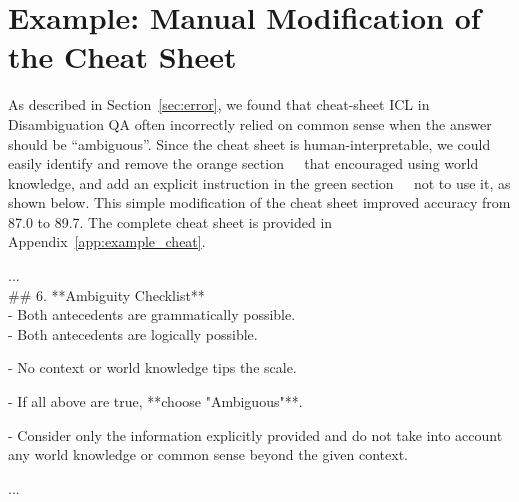 \documentclass[11pt]{article}
\begin{document}
\section{Example: Manual Modification of the Cheat Sheet}
\label{app:manual_revision}

As described in Section~\ref{sec:error}, we found that cheat-sheet ICL in Disambiguation QA often incorrectly relied on common sense when the answer should be ``ambiguous''.
Since the cheat sheet is human-interpretable, we could easily identify and remove the \colorbox{diffred!40}{orange section \textcolor{white}{$-$}} that encouraged using world knowledge, and add an explicit instruction in the \colorbox{diffgreen!40}{green section \textcolor{white}{$+$}}  not to use it, as shown below.
This simple modification of the cheat sheet improved accuracy from 87.0 to 89.7.
The complete cheat sheet is provided in Appendix~\ref{app:example_cheat}.

\begin{tcolorbox}[title=Manual Modification of Cheat Sheet, colback=white, colframe=black!70, boxrule=0.5pt, top=0pt, bottom=0pt, left=0pt, right=0pt, arc=0.8mm]
...\\
\#\# 6. **Ambiguity Checklist**\\
- Both antecedents are grammatically possible.\\
- Both antecedents are logically possible.
\begin{tcolorbox}[
    colback=diffred!40,
    colframe=white,
    boxrule=0pt,
    leftrule=0pt, rightrule=0pt, toprule=0pt, bottomrule=0pt,
    sharp corners,
    boxsep=0pt, left=0pt, right=0pt, top=0pt, bottom=0pt,
    width=\textwidth,
    enlarge left by=0mm, enlarge right by=0mm,
    before skip=3pt, after skip=3pt,
]
- No context or world knowledge tips the scale.~\textcolor{white}{$\bm{-}$}
\end{tcolorbox}
- If all above are true, **choose "Ambiguous"**.
\begin{tcolorbox}[
    colback=diffgreen!40,
    colframe=white,
    boxrule=0pt,
    leftrule=0pt, rightrule=0pt, toprule=0pt, bottomrule=0pt,
    sharp corners,
    boxsep=0pt, left=0pt, right=0pt, top=0pt, bottom=0pt,
    width=\textwidth,
    enlarge left by=0mm, enlarge right by=0mm,
    before skip=3pt, after skip=6pt,
]
- Consider only the information explicitly provided and do not take into account any world knowledge or common sense beyond the given context. \textcolor{white}{$\bm{+}$}
\end{tcolorbox}
...
\end{tcolorbox}
\end{document}
